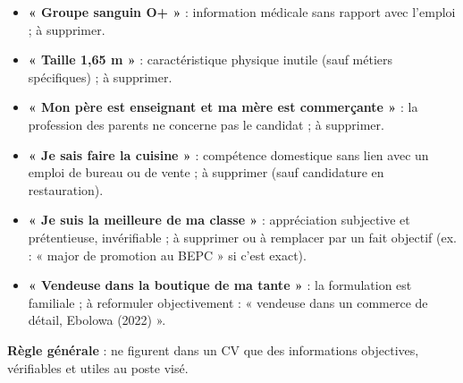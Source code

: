 \documentclass[11pt]{article}
\newcommand{\cle}[1]{{\popxbold\color{popdark}#1}}
\begin{document}
\begin{corrige}
\begin{itemize}
\item \textbf{« Groupe sanguin O+ »} : information médicale sans rapport avec l'emploi ; à supprimer.
\item \textbf{« Taille 1,65 m »} : caractéristique physique inutile (sauf métiers spécifiques) ; à supprimer.
\item \textbf{« Mon père est enseignant et ma mère est commerçante »} : la profession des parents ne concerne pas le candidat ; à supprimer.
\item \textbf{« Je sais faire la cuisine »} : compétence domestique sans lien avec un emploi de bureau ou de vente ; à supprimer (sauf candidature en restauration).
\item \textbf{« Je suis la meilleure de ma classe »} : appréciation subjective et prétentieuse, invérifiable ; à supprimer ou à remplacer par un fait objectif (ex. : « major de promotion au BEPC » si c'est exact).
\item \textbf{« Vendeuse dans la boutique de ma tante »} : la formulation est familiale ; à reformuler objectivement : « vendeuse dans un commerce de détail, Ebolowa (2022) ».
\end{itemize}
\textbf{Règle générale} : ne figurent dans un \cle{CV} que des informations objectives, vérifiables et utiles au poste visé.
\end{corrige}
\end{document}
